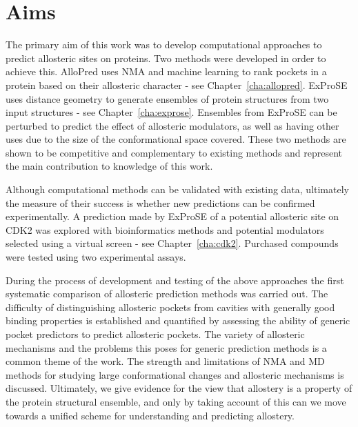 \section{Aims}
\label{sec:introduction_aims}

The primary aim of this work was to develop computational approaches to predict allosteric sites on proteins.
Two methods were developed in order to achieve this.
AlloPred uses NMA and machine learning to rank pockets in a protein based on their allosteric character - see Chapter~\ref{cha:allopred}.
ExProSE uses distance geometry to generate ensembles of protein structures from two input structures - see Chapter~\ref{cha:exprose}.
Ensembles from ExProSE can be perturbed to predict the effect of allosteric modulators, as well as having other uses due to the size of the conformational space covered.
These two methods are shown to be competitive and complementary to existing methods and represent the main contribution to knowledge of this work.

Although computational methods can be validated with existing data, ultimately the measure of their success is whether new predictions can be confirmed experimentally.
A prediction made by ExProSE of a potential allosteric site on CDK2 was explored with bioinformatics methods and potential modulators selected using a virtual screen - see Chapter~\ref{cha:cdk2}.
Purchased compounds were tested using two experimental assays.

During the process of development and testing of the above approaches the first systematic comparison of allosteric prediction methods was carried out.
The difficulty of distinguishing allosteric pockets from cavities with generally good binding properties is established and quantified by assessing the ability of generic pocket predictors to predict allosteric pockets.
The variety of allosteric mechanisms \cite{Motlagh2014} and the problems this poses for generic prediction methods is a common theme of the work.
The strength and limitations of NMA and MD methods for studying large conformational changes and allosteric mechanisms is discussed.
Ultimately, we give evidence for the view that allostery is a property of the protein structural ensemble, and only by taking account of this can we move towards a unified scheme for understanding and predicting allostery.
